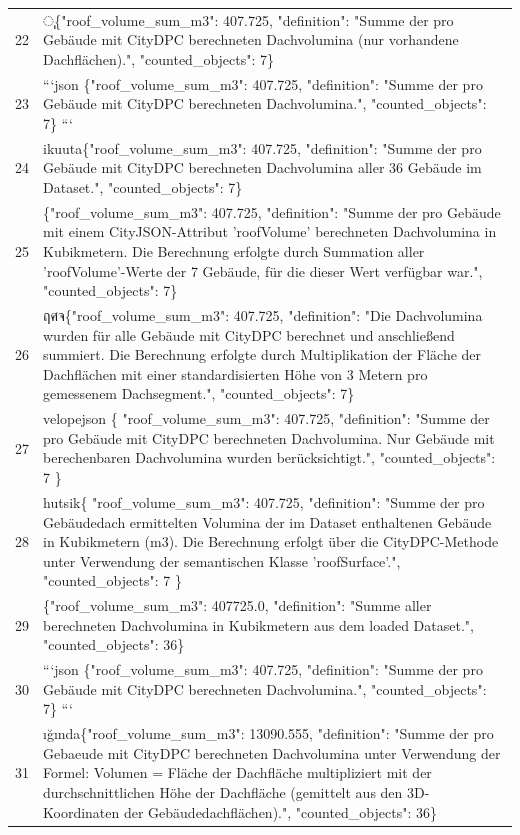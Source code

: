 \documentclass[a4paper,11pt]{article}
\begin{document}
\begin{table}[ht]
\begin{tabular}{r p{12cm}}
22 & ு\{"roof\_volume\_sum\_m3": 407.725, "definition": "Summe der pro Gebäude mit CityDPC berechneten Dachvolumina (nur vorhandene Dachflächen).", "counted\_objects": 7\} \\
23 & ```json
\{"roof\_volume\_sum\_m3": 407.725, "definition": "Summe der pro Gebäude mit CityDPC berechneten Dachvolumina.", "counted\_objects": 7\}
``` \\
24 & ikuuta\{"roof\_volume\_sum\_m3": 407.725, "definition": "Summe der pro Gebäude mit CityDPC berechneten Dachvolumina aller 36 Gebäude im Dataset.", "counted\_objects": 7\} \\
25 & \{"roof\_volume\_sum\_m3": 407.725, "definition": "Summe der pro Gebäude mit einem CityJSON-Attribut 'roofVolume' berechneten Dachvolumina in Kubikmetern. Die Berechnung erfolgte durch Summation aller 'roofVolume'-Werte der 7 Gebäude, für die dieser Wert verfügbar war.", "counted\_objects": 7\} \\
26 & ฤศจ\{"roof\_volume\_sum\_m3": 407.725, "definition": "Die Dachvolumina wurden für alle Gebäude mit CityDPC berechnet und anschließend summiert. Die Berechnung erfolgte durch Multiplikation der Fläche der Dachflächen mit einer standardisierten Höhe von 3 Metern pro gemessenem Dachsegment.", "counted\_objects": 7\} \\
27 & velopejson
\{
  "roof\_volume\_sum\_m3": 407.725,
  "definition": "Summe der pro Gebäude mit CityDPC berechneten Dachvolumina. Nur Gebäude mit berechenbaren Dachvolumina wurden berücksichtigt.",
  "counted\_objects": 7
\} \\
28 &  hutsik\{
  "roof\_volume\_sum\_m3": 407.725,
  "definition": "Summe der pro Gebäudedach ermittelten Volumina der im Dataset enthaltenen Gebäude in Kubikmetern (m3). Die Berechnung erfolgt über die CityDPC-Methode unter Verwendung der semantischen Klasse 'roofSurface'.",
  "counted\_objects": 7
\} \\
29 & \{"roof\_volume\_sum\_m3": 407725.0, "definition": "Summe aller berechneten Dachvolumina in Kubikmetern aus dem loaded Dataset.", "counted\_objects": 36\} \\
30 & ```json
\{"roof\_volume\_sum\_m3": 407.725, "definition": "Summe der pro Gebäude mit CityDPC berechneten Dachvolumina.", "counted\_objects": 7\}
``` \\
31 & ığında\{"roof\_volume\_sum\_m3": 13090.555, "definition": "Summe der pro Gebaeude mit CityDPC berechneten Dachvolumina unter Verwendung der Formel: Volumen = Fläche der Dachfläche multipliziert mit der durchschnittlichen Höhe der Dachfläche (gemittelt aus den 3D-Koordinaten der Gebäudedachflächen).", "counted\_objects": 36\} \\

\end{tabular}
\end{table}
\end{document}
